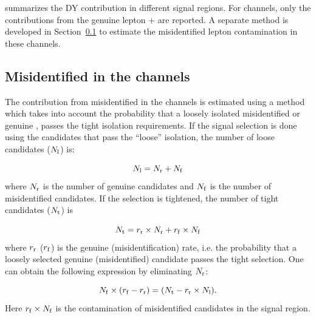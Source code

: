 summarizes the DY contribution in different signal regions. 
For \leptonTau channels, only the contributions from the genuine lepton + \Tau are reported. 
A separate method is developed in Section~\ref{sect:bkgFake} to estimate the misidentified lepton contamination in these channels.

\subsection{\texorpdfstring{Misidentified \Tau in the \leptonTau channels}{Misidentified tau in the lepton-tau channels}}
\label{sect:bkgFake}
The contribution from misidentified \Tau in the \leptonTau channels is estimated using a method which takes into account the probability that a loosely isolated misidentified or genuine \Tau,
passes the tight isolation requirements.
If the signal selection is done using the \Tau candidates that pass the ``loose'' isolation, 
the number of loose \Tau candidates ($N_{\rm l}$) is:

\begin{equation}
N_{\rm l} = N_{\rm r} + N_{\rm f}
\end{equation}
where $N_{\rm r}$ is the number of genuine \Tau candidates and $N_{\rm f}$ is the number of misidentified 
\Tau candidates. If the selection is tightened, the number of tight \Tau candidates ($N_{\rm t}$)  is

\begin{equation}
 N_{\rm t} = r_{\rm r}\times N_{\rm r} + r_{\rm f}\times N_{\rm f}
\end{equation} 
where $r_{\rm r}$ ($r_{\rm f}$) is the genuine (misidentification) rate, i.e. the probability that a loosely selected genuine (misidentified) \Tau candidate passes the  tight  selection. 
One can obtain the following expression by eliminating $N_{\rm r}$:

\begin{equation}
   N_{\rm f}\times (r_{\rm f}-r_{\rm r}) = (N_{\rm t} - r_{\rm r}\times N_{\rm l}).
\end{equation}
Here $r_{\rm f}\times N_{\rm f}$ is the contamination of misidentified \Tau candidates in the signal region. 

